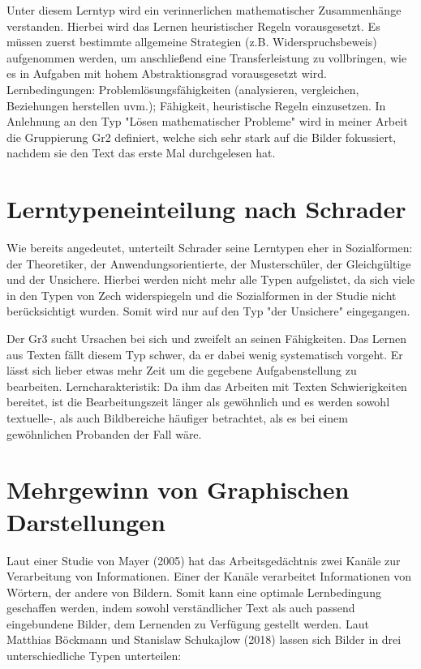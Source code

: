 Unter diesem Lerntyp wird ein verinnerlichen mathematischer Zusammenhänge verstanden. Hierbei wird das Lernen heuristischer Regeln vorausgesetzt. Es müssen zuerst bestimmte allgemeine Strategien (z.B. Widerspruchsbeweis) aufgenommen werden, um anschließend eine Transferleistung zu vollbringen, wie es in Aufgaben mit hohem Abstraktionsgrad vorausgesetzt wird. 
Lernbedingungen: Problemlösungsfähigkeiten (analysieren, vergleichen, Beziehungen herstellen uvm.); Fähigkeit, heuristische Regeln einzusetzen.
In Anlehnung an den Typ "Lösen mathematischer Probleme" wird in meiner Arbeit die Gruppierung \gls{Gr2} definiert, welche sich sehr stark auf die Bilder fokussiert, nachdem sie den Text das erste Mal durchgelesen hat\cite{zech1983grundkurs}.

\section{Lerntypeneinteilung nach Schrader}

Wie bereits angedeutet, unterteilt Schrader seine Lerntypen eher in Sozialformen: der Theoretiker, der Anwendungsorientierte, der Musterschüler, der Gleichgültige und der Unsichere. Hierbei werden nicht mehr alle Typen aufgelistet, da sich viele in den Typen von Zech widerspiegeln und die Sozialformen in der Studie nicht berücksichtigt wurden. Somit wird nur auf den Typ "der Unsichere" eingegangen.

Der \gls{Gr3} sucht Ursachen bei sich und zweifelt an seinen Fähigkeiten. Das Lernen aus Texten fällt diesem Typ schwer, da er dabei wenig systematisch vorgeht. Er lässt sich lieber etwas mehr Zeit um die gegebene Aufgabenstellung zu bearbeiten.
Lerncharakteristik: Da ihm das Arbeiten mit Texten Schwierigkeiten bereitet, ist die Bearbeitungszeit länger als gewöhnlich und es werden sowohl textuelle-, als auch Bildbereiche häufiger betrachtet, als es bei einem gewöhnlichen Probanden der Fall wäre\cite{schrader2008lerntypen}. 

\section{Mehrgewinn von Graphischen Darstellungen}

Laut einer Studie von Mayer (2005) hat das Arbeitsgedächtnis zwei Kanäle zur Verarbeitung von Informationen. Einer der Kanäle verarbeitet Informationen von Wörtern, der andere von Bildern\cite{mayer2005reliability}. Somit kann eine optimale Lernbedingung geschaffen werden, indem sowohl verständlicher Text als auch passend eingebundene Bilder, dem Lernenden zu Verfügung gestellt werden. Laut Matthias Böckmann und Stanislaw Schukajlow (2018) lassen sich Bilder in drei unterschiedliche Typen unterteilen:
    

